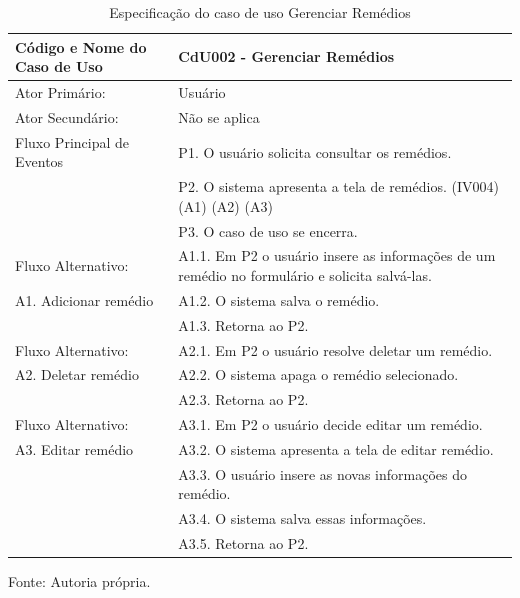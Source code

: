 \begin{apendicesenv}
\begin{table}[!h]
	\begin{center}
		\caption{Especificação do caso de uso Gerenciar Remédios}
		\begin{tabular}{ | l |  p{10cm} |}
			\hline
			Código e Nome do Caso de Uso & CdU002 - Gerenciar Remédios \\ \hline
			Ator Primário: & Usuário \\
			Ator Secundário: & Não se aplica \\ \hline
			Fluxo Principal de Eventos & P1. O usuário solicita consultar os remédios. \\
						   & P2. O sistema apresenta a tela de remédios. (IV004) (A1) (A2) (A3) \\
						   & P3. O caso de uso se encerra. \\ \hline
			Fluxo Alternativo:         & A1.1. Em P2 o usuário insere as informações de um remédio no formulário e solicita salvá-las. \\
			A1. Adicionar remédio      & A1.2. O sistema salva o remédio. \\
						   & A1.3. Retorna ao P2. \\ \hline
			Fluxo Alternativo:         & A2.1. Em P2 o usuário resolve deletar um remédio. \\
			A2. Deletar remédio        & A2.2. O sistema apaga o remédio selecionado. \\
						   & A2.3. Retorna ao P2. \\ \hline
			Fluxo Alternativo:         & A3.1. Em P2 o usuário decide editar um remédio. \\
			A3. Editar remédio         & A3.2. O sistema apresenta a tela de editar remédio. \\
						   & A3.3. O usuário insere as novas informações do remédio. \\
						   & A3.4. O sistema salva essas informações. \\
						   & A3.5. Retorna ao P2. \\
			\hline
		\end{tabular}
		Fonte: Autoria própria.
	\end{center}
\end{table}


\end{apendicesenv}

